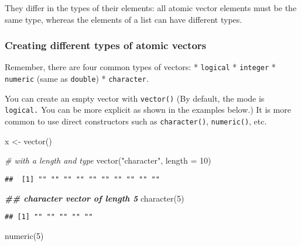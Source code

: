 \documentclass[
]{book}
\newenvironment{Shaded}{\begin{snugshade}}{\end{snugshade}}
\newcommand{\AttributeTok}[1]{\textcolor[rgb]{0.77,0.63,0.00}{#1}}
\newcommand{\CommentTok}[1]{\textcolor[rgb]{0.56,0.35,0.01}{\textit{#1}}}
\newcommand{\DecValTok}[1]{\textcolor[rgb]{0.00,0.00,0.81}{#1}}
\newcommand{\DocumentationTok}[1]{\textcolor[rgb]{0.56,0.35,0.01}{\textbf{\textit{#1}}}}
\newcommand{\FunctionTok}[1]{\textcolor[rgb]{0.00,0.00,0.00}{#1}}
\newcommand{\NormalTok}[1]{#1}
\newcommand{\OtherTok}[1]{\textcolor[rgb]{0.56,0.35,0.01}{#1}}
\newcommand{\StringTok}[1]{\textcolor[rgb]{0.31,0.60,0.02}{#1}}
\begin{document}
They differ in the types of their elements: all atomic vector elements must be the same type, whereas the elements of a list can have different types.

\hypertarget{creating-different-types-of-atomic-vectors}{%
\subsubsection{Creating different types of atomic vectors}\label{creating-different-types-of-atomic-vectors}}

Remember, there are four common types of vectors:
* \texttt{logical}
* \texttt{integer}
* \texttt{numeric} (same as \texttt{double})
* \texttt{character}.

You can create an empty vector with \texttt{vector()} (By default, the mode is \texttt{logical.} You can be more explicit as shown in the examples below.) It is more common to use direct constructors such as \texttt{character()}, \texttt{numeric()}, etc.

\begin{Shaded}
\begin{Highlighting}[]
\NormalTok{x }\OtherTok{\textless{}{-}} \FunctionTok{vector}\NormalTok{()}

\CommentTok{\# with a length and type}
\FunctionTok{vector}\NormalTok{(}\StringTok{"character"}\NormalTok{, }\AttributeTok{length =} \DecValTok{10}\NormalTok{)}
\end{Highlighting}
\end{Shaded}

\begin{verbatim}
##  [1] "" "" "" "" "" "" "" "" "" ""
\end{verbatim}

\begin{Shaded}
\begin{Highlighting}[]
\DocumentationTok{\#\# character vector of length 5}
\FunctionTok{character}\NormalTok{(}\DecValTok{5}\NormalTok{)}
\end{Highlighting}
\end{Shaded}

\begin{verbatim}
## [1] "" "" "" "" ""
\end{verbatim}

\begin{Shaded}
\begin{Highlighting}[]
\FunctionTok{numeric}\NormalTok{(}\DecValTok{5}\NormalTok{)}
\end{Highlighting}
\end{Shaded}
\end{document}

